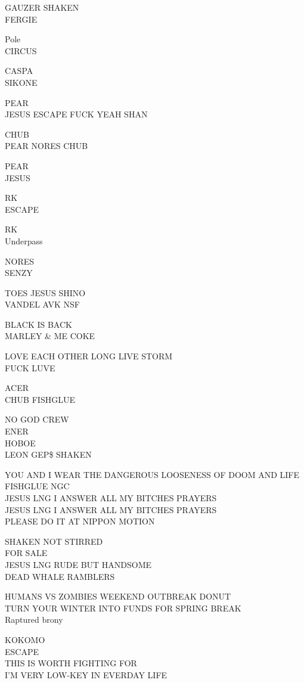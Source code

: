 \documentclass[10pt,letterpaper]{article}
\begin{document}
GAUZER SHAKEN\\
FERGIE

Pole\\
CIRCUS

CASPA\\
SIKONE

PEAR\\
JESUS ESCAPE FUCK YEAH SHAN

CHUB\\
PEAR NORES CHUB

PEAR\\
JESUS

RK\\
ESCAPE

RK\\
Underpass

NORES\\
SENZY

TOES JESUS SHINO\\
VANDEL AVK NSF

BLACK IS BACK\\
MARLEY \& ME COKE

LOVE EACH OTHER LONG LIVE STORM\\
FUCK LUVE

ACER\\
CHUB FISHGLUE

NO GOD CREW\\
ENER\\
HOBOE\\
LEON GEP\$ SHAKEN

YOU AND I WEAR THE DANGEROUS LOOSENESS OF DOOM AND LIFE FISHGLUE NGC\\
JESUS LNG I ANSWER ALL MY BITCHES PRAYERS\\
JESUS LNG I ANSWER ALL MY BITCHES PRAYERS\\
PLEASE DO IT AT NIPPON MOTION

SHAKEN NOT STIRRED\\
FOR SALE\\
JESUS LNG RUDE BUT HANDSOME\\
DEAD WHALE RAMBLERS

HUMANS VS ZOMBIES WEEKEND OUTBREAK DONUT\\
TURN YOUR WINTER INTO FUNDS FOR SPRING BREAK\\
Raptured brony

KOKOMO\\
ESCAPE\\
THIS IS WORTH FIGHTING FOR\\
I'M VERY LOW{-}KEY IN EVERDAY LIFE
\end{document}
